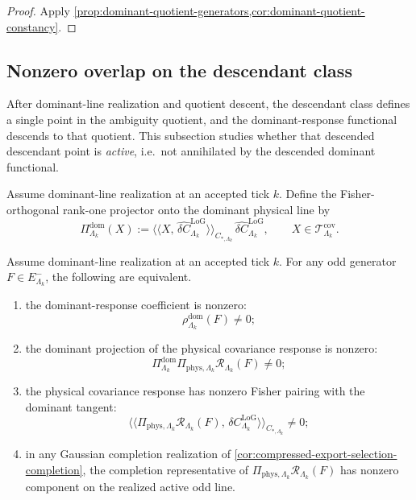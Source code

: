 \documentclass[11pt]{article}
\begin{document}
\begin{proof}
Apply \cref{prop:dominant-quotient-generators,cor:dominant-quotient-constancy}.
\end{proof}

\subsection*{Nonzero overlap on the descendant class}
\label{subsec:descendant-overlap}

After dominant-line realization and quotient descent, the descendant class defines a single point in
the ambiguity quotient, and the dominant-response functional descends to that quotient. This
subsection studies whether that descended descendant point is \emph{active}, i.e.\ not annihilated
by the descended dominant functional.

\begin{definition}
\label{def:dominant-cov-projector}
Assume dominant-line realization at an accepted tick \(k\).
Define the Fisher-orthogonal rank-one projector onto the dominant physical line by
\begin{equation}
\Pi^{\mathrm{dom}}_{\Lambda_k}(X)
:=
\big\langle\!\big\langle
X,\,
\widehat{\delta C}^{\mathrm{LoG}}_{\Lambda_k}
\big\rangle\!\big\rangle_{C_{\ast,\Lambda_k}}\,
\widehat{\delta C}^{\mathrm{LoG}}_{\Lambda_k},
\qquad
X\in\mathcal T^{\mathrm{cov}}_{\Lambda_k}.
\label{eq:Pi-dom-def}
\end{equation}
\end{definition}

\begin{proposition}
\label{prop:descendant-overlap-witness}
Assume dominant-line realization at an accepted tick \(k\).
For any odd generator \(F\in E^-_{\Lambda_k}\), the following are equivalent.
\begin{enumerate}[leftmargin=2em]
\item the dominant-response coefficient is nonzero:
  \[
  \rho^{\mathrm{dom}}_{\Lambda_k}(F)\neq 0;
  \]
\item the dominant projection of the physical covariance response is nonzero:
  \[
  \Pi^{\mathrm{dom}}_{\Lambda_k}\Pi_{\mathrm{phys},\Lambda_k}\mathcal R_{\Lambda_k}(F)\neq 0;
  \]
\item the physical covariance response has nonzero Fisher pairing with the dominant tangent:
  \[
  \big\langle\!\big\langle
  \Pi_{\mathrm{phys},\Lambda_k}\mathcal R_{\Lambda_k}(F),\,
  \delta C^{\mathrm{LoG}}_{\Lambda_k}
  \big\rangle\!\big\rangle_{C_{\ast,\Lambda_k}}
  \neq 0;
  \]
\item in any Gaussian completion realization of
  \cref{cor:compressed-export-selection-completion}, the completion representative of
  \(\Pi_{\mathrm{phys},\Lambda_k}\mathcal R_{\Lambda_k}(F)\) has nonzero component on the realized
  active odd line.
\end{enumerate}
\end{proposition}
\end{document}
